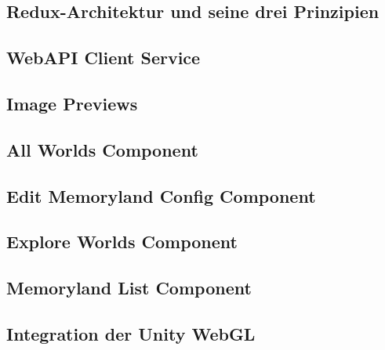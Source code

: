 \subsection{Redux-Architektur und seine drei Prinzipien}


\subsection{WebAPI Client Service}

\subsection{Image Previews}

\subsection{All Worlds Component}

\subsection{Edit Memoryland Config Component}

\subsection{Explore Worlds Component}

\subsection{Memoryland List Component}


\subsection{Integration der Unity WebGL}
\label{sec:frontend-integration-webgl}




